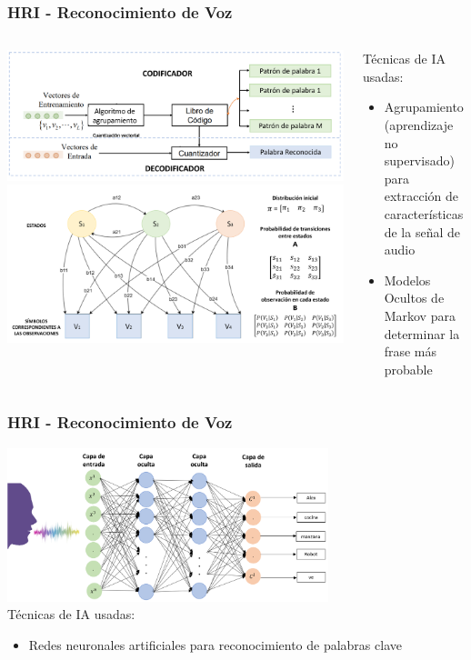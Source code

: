\documentclass[10pt,spanish,aspectratio=1610]{beamer}
\begin{document}
\begin{frame}\frametitle{HRI - Reconocimiento de Voz}
  \centering
    \begin{columns}
    \begin{column}{0.65\textwidth}
      \includegraphics[width=\textwidth]{Figures/SpeechRecogVQ.png}
      \includegraphics[width=\textwidth]{Figures/SpeechRecogHMM.png}
    \end{column}
    \begin{column}{0.35\textwidth}
      Técnicas de IA usadas:
      \begin{itemize}
      \item Agrupamiento (aprendizaje no supervisado) para extracción de características de la señal de audio
      \item Modelos Ocultos de Markov para determinar la frase más probable
      \end{itemize}
    \end{column}
  \end{columns}
\end{frame}

\begin{frame}\frametitle{HRI - Reconocimiento de Voz}
  \centering
  \includegraphics[width=0.7\textwidth]{Figures/SpeechRecogANN.png}\\
  \[\]
  Técnicas de IA usadas:
  \begin{itemize}
    \item Redes neuronales artificiales para reconocimiento de palabras clave
  \end{itemize}
\end{frame}
\end{document}
